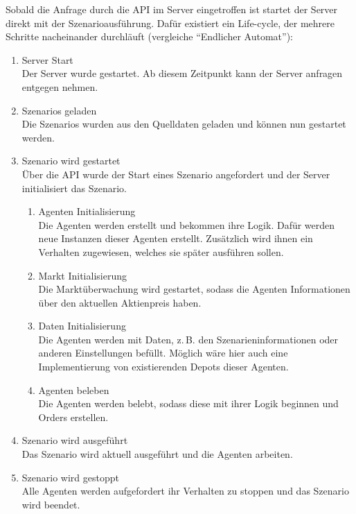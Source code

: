 Sobald die Anfrage durch die \ac{API} im Server eingetroffen ist startet der Server direkt mit der Szenarioausführung. Dafür existiert ein Life-cycle, der mehrere Schritte nacheinander durchläuft (vergleiche \enquote{Endlicher Automat}):

\begin{enumerate}
    \item Server Start\\
        Der Server wurde gestartet. Ab diesem Zeitpunkt kann der Server anfragen entgegen nehmen.
    \item Szenarios geladen\\
        Die Szenarios wurden aus den Quelldaten geladen und können nun gestartet werden.
    \item Szenario wird gestartet\\
        Über die \ac{API} wurde der Start eines Szenario angefordert und der Server initialisiert das Szenario.
        \begin{enumerate}
            \item Agenten Initialisierung\\
                Die Agenten werden erstellt und bekommen ihre Logik. Dafür werden neue Instanzen dieser Agenten erstellt. Zusätzlich wird ihnen ein Verhalten zugewiesen, welches sie später ausführen sollen.
            \item Markt Initialisierung\\
                Die Marktüberwachung wird gestartet, sodass die Agenten Informationen über den aktuellen Aktienpreis haben.
            \item Daten Initialisierung\\
                Die Agenten werden mit Daten, z.\,B. den Szenarieninformationen oder anderen Einstellungen befüllt.
                Möglich wäre hier auch eine Implementierung von existierenden Depots dieser Agenten.
            \item Agenten beleben\\
                Die Agenten werden belebt, sodass diese mit ihrer Logik beginnen und Orders erstellen.
        \end{enumerate}
    \item Szenario wird ausgeführt\\
        Das Szenario wird aktuell ausgeführt und die Agenten arbeiten.
    \item Szenario wird gestoppt\\
        Alle Agenten werden aufgefordert ihr Verhalten zu stoppen und das Szenario wird beendet.
\end{enumerate}


